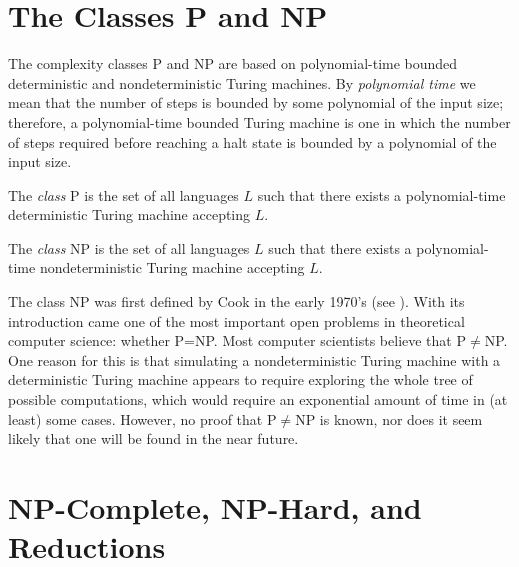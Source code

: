 \section{The Classes P and NP}

The complexity classes P and NP are based on polynomial-time bounded
deterministic and nondeterministic Turing machines.  By {\em polynomial
time\/} we mean that the number of steps is bounded by some polynomial of the
input size; therefore, a polynomial-time bounded Turing machine is one in
which the number of steps required before reaching a halt state is bounded by
a polynomial of the input size.

\begin{definition}
{\rm The {\em class\/} P is the set of all languages $L$ such that there
exists a polynomial-time deterministic Turing machine accepting $L$.}
\end{definition}

\begin{definition}
{\rm The {\em class\/} NP is the set of all languages $L$ such that there
exists a polynomial-time nondeterministic Turing machine accepting $L$.}
\end{definition}

The class NP was first defined by Cook in the early 1970's (see
\cite{Cook1971}).  With its introduction came one of the most important open
problems in theoretical computer science: whether P=NP.
Most computer scientists believe that P$\neq$NP.
One reason for this is that simulating a nondeterministic
Turing machine with a deterministic Turing machine appears to require
exploring the whole tree of possible computations, which would require an
exponential amount of time in (at least) some cases.  However, no proof that
P$\neq$NP is known, nor does it seem likely that one will be found in the
near future.

\section{NP-Complete, NP-Hard, and Reductions}

